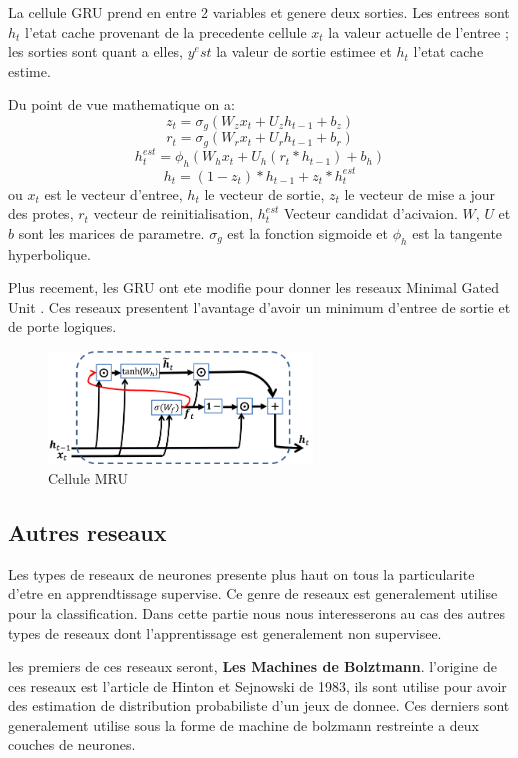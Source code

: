 \documentclass[twoside,twocolumn]{article}
\begin{document}
La cellule GRU prend en entre 2 variables et genere deux sorties. Les entrees sont $h_t$ l'etat cache provenant de la precedente cellule 
$x_t$ la valeur actuelle de l'entree ; les sorties sont quant a elles, $y^est$ la valeur de sortie estimee et $h_t$ l'etat cache estime.

Du point de vue mathematique on a:
\[z_t = \sigma_g(W_{z}x_{t} + U_{z}h_{t-1} + b_{z})\]
\[r_t = \sigma_g(W_{r}x_{t} + U_{r}h_{t-1} + b_{r})\]
\[h_{t}^{est} = \phi_h(W_{h}x_{t} + U_{h}(r_t * h_{t-1}) + b_{h})\]
\[h_t = (1 - z_t)*h_{t-1} + z_t*h_{t}^{est}\]
ou $x_t$ est le vecteur d'entree, $h_t$ le vecteur de sortie, $z_t$ le vecteur de mise a jour des protes, $r_t$ vecteur de reinitialisation, $h_t^{est}$ Vecteur candidat d'acivaion.
$W$, $U$ et $b$ sont les marices de parametre. $\sigma_g$ est la fonction sigmoide et $\phi_h$ est la tangente hyperbolique.

Plus recement, les GRU ont ete modifie pour donner les reseaux Minimal Gated Unit \cite{heck2017simplified}\cite{zhou2016minimal}. Ces reseaux presentent l'avantage d'avoir un minimum
d'entree de sortie et de porte logiques.

\begin{figure}[h]
  \centering
  \includegraphics[width=70mm]{MRU.png}
  \caption{Cellule MRU}
  \label{MRUs}
\end{figure}

\subsection{Autres reseaux}
Les types de reseaux de neurones presente plus haut on tous la particularite d'etre en apprendtissage supervise. Ce genre  de reseaux est generalement utilise pour la classification.
Dans cette partie nous nous interesserons au cas des autres types de reseaux dont l'apprentissage est generalement non supervisee. 

les premiers de ces reseaux seront, \textbf{Les Machines de Bolztmann}. l'origine de ces reseaux est l'article de Hinton et Sejnowski de 1983\cite{Rumelhart2}, ils sont utilise pour avoir des estimation de distribution
probabiliste d'un jeux de donnee\cite{Salakhutdinov}. Ces derniers sont generalement utilise sous la forme de machine de bolzmann restreinte a deux couches de neurones. 
\end{document}
